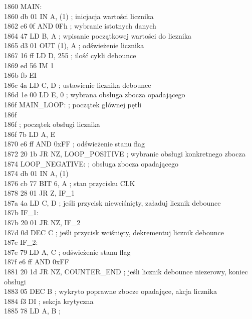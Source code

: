 \documentclass[a4paper,titlepage,11pt,floatssmall]{mwrep}
\begin{document}
\begin{flushleft}
1860			MAIN: \\
1860 db 01			IN A, (1) 	; inicjacja wartości licznika \\
1862 e6 0f			AND 0Fh		; wybranie istotnych danych \\
1864 47				LD B, A		; wpisanie początkowej wartości do licznika \\
1865 d3 01			OUT (1), A	; odświeżenie licznika \\
1867 16 ff			LD D, 255 	; ilość cykli debounce \\
1869 ed 56			IM 1 \\
186b fb				EI	 \\
186c 4a				LD C, D 	; ustawienie licznika debounce \\
186d 1e 00			LD E, 0 	; wybrana obsługa zbocza opadającego \\
186f			MAIN\_LOOP: 		; początek głównej pętli \\
186f			 \\
186f				; początek obsługi licznika \\
186f 7b					LD A, E \\
1870 e6 ff				AND 0xFF	; odświeżenie stanu flag \\
1872 20 1b				JR NZ, LOOP\_POSITIVE ; wybranie obsługi konkretnego zbocza \\
1874				LOOP\_NEGATIVE:	; obsługa zbocza opadającego \\
1874 db 01				IN A, (1) \\
1876 cb 77				BIT 6, A 	; stan przycisku CLK \\
1878 28 01				JR Z, IF\_1 \\
187a 4a					LD C, D 	; jeśli przycisk niewciśnięty, załaduj licznik debounce \\
187b				IF\_1: \\
187b 20 01				JR NZ, IF\_2 \\
187d 0d					DEC C 		; jeśli przycisk wciśnięty, dekrementuj licznik debounce \\
187e				IF\_2: \\
187e 79					LD A, C		; odświeżenie stanu flag \\
187f e6 ff				AND 0xFF \\
1881 20 1d				JR NZ, COUNTER\_END ; jeśli licznik debounce niezerowy, koniec obsługi \\
1883 05					DEC B		; wykryto poprawne zbocze opadające, akcja licznika \\
1884 f3					DI			; sekcja krytyczna \\
1885 78					LD A, B		;  \\

\end{flushleft}
\end{document}
